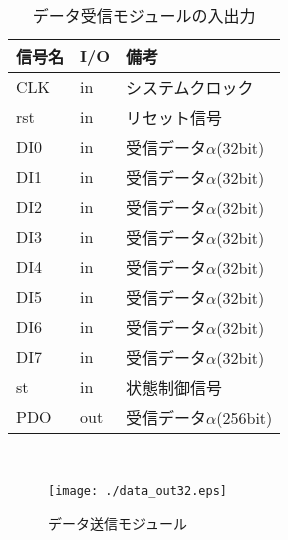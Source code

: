 \documentclass{thesis}
\begin{document}
\begin{table}[htb]
　\begin{center}
\caption{データ受信モジュールの入出力}
\label{data_inIO}
  \begin{tabular}{|p{2cm}|p{1cm}|p{4cm}|} \hline
  信号名 & I/O & 備考 \\ \hline \hline
   CLK   &  in   & システムクロック  \\ \hline
   rst   &  in   &  リセット信号  \\ \hline
   DI0  &  in   &  受信データ$\alpha$(32bit)  \\ \hline
   DI1  &  in   &  受信データ$\alpha$(32bit)  \\ \hline
   DI2  &  in   &  受信データ$\alpha$(32bit)  \\ \hline
   DI3  &  in   &  受信データ$\alpha$(32bit)  \\ \hline
   DI4  &  in   &  受信データ$\alpha$(32bit)  \\ \hline
   DI5  &  in   &  受信データ$\alpha$(32bit)  \\ \hline
   DI6  &  in   &  受信データ$\alpha$(32bit)  \\ \hline
   DI7  &  in   &  受信データ$\alpha$(32bit)  \\ \hline
   st      &  in    &  状態制御信号  \\ \hline
   PDO   &  out  &  受信データ$\alpha$(256bit)  \\ \hline
  \end{tabular}
  \end{center}
\end{table}　\\

\begin{figure}[H]
 \center
 \texttt{[image: ./data\_out32.eps]}
 \caption{データ送信モジュール}
 \label{data_out}
\end{figure}
\end{document}
